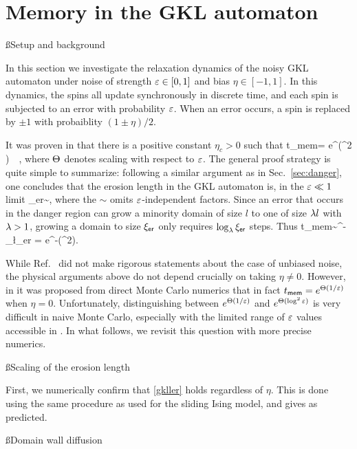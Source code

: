 \documentclass[12pt]{article}
\newcommand{\ler}{\ell_{\sf er}}
\newcommand{\tmem}{t_{\sf mem}}
\renewcommand{\ler}{{\xi_{\sf er}}}
\begin{document}
\section{Memory in the GKL automaton}

\ss{Setup and background}

In this section we investigate the relaxation dynamics of the noisy GKL automaton \cite{gacs1978one} under noise of strength $\varepsilon \in [0,1]$ and bias $\eta \in [-1,1]$. In this dynamics, the spins all update synchronously in discrete time, and each spin is subjected to an error with probability $\varepsilon$. When an error occurs, a spin is replaced by $\pm1$ with probaiblity $(1\pm \eta)/2$.

It was proven in \cite{park1997ergodicity} that there is a positive constant $\eta_c>0$ such that 
\be \tmem = e^{\ct(\log^2 \ep)} \qq \forall \, \,\eta \in [-1, -\eta_c] \cup [\eta_c , 1],\ee 
where $\Theta$ denotes scaling with respect to $\varepsilon$. The general proof strategy is quite simple to summarize: following a similar argument as in Sec.~\ref{sec:danger}, one concludes that the erosion length in the GKL automaton is, in the $\varepsilon\ll1$ limit 
\be \label{gkller} \ler \sim {},\ee 
where the $\sim$ omits $\varepsilon$-independent factors. 
Since an error that occurs in the danger region can grow a minority domain of size $l$ to one of size $\lambda l$ with $\lambda > 1$, growing a domain to size $\ler$ only requires $\log_\l \ler$ steps. Thus 
\be \label{gkl_tmem} \tmem \sim \ep^{-\log_\l \ler} = e^{-\ct(\log ^2\ep)}.\ee 

While Ref.~\cite{park1997ergodicity} did not make rigorous statements about the case of unbiased noise, the physical arguments above do not depend crucially on taking $\eta \neq 0$. However, in \cite{de1992gacs} it was proposed from direct Monte Carlo numerics that in fact $\tmem = e^{\ct(1/\ep)}$ when $\eta = 0$. Unfortunately, distinguishing between $e^{\Theta(1/\varepsilon)}$ and $e^{\Theta( \log^2 \varepsilon)}$ is very difficult in naive Monte Carlo, especially with the limited range of $\varepsilon$ values accessible in \cite{de1992gacs}. In what follows, we revisit this question with more precise numerics. 

\ss{Scaling of the erosion length} 

First, we numerically confirm that \eqref{gkller} holds regardless of $\eta$. This is done using the same procedure as used for the sliding Ising model, and gives 
\be {} \ee 
as predicted. 

\ss{Domain wall diffusion} 
\end{document}
